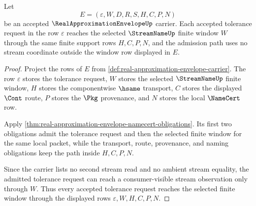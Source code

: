 \begin{theorem}
\label{thm:real-approximation-envelope-tolerance-window-admission}
Let
$$
E=(\varepsilon,W,D,R,S,H,C,P,N)
$$
be an accepted $\RealApproximationEnvelopeUp$ carrier. Each accepted tolerance request in the row $\varepsilon$ reaches the selected $\StreamNameUp$ finite window $W$ through the same finite support rows $H,C,P,N$, and the admission path uses no stream coordinate outside the window row displayed in $E$.
\end{theorem}
\begin{proof}
Project the rows of $E$ from \autoref{def:real-approximation-envelope-carrier}. The row $\varepsilon$ stores the tolerance request, $W$ stores the selected $\StreamNameUp$ finite window, $H$ stores the componentwise $\hsame$ transport, $C$ stores the displayed $\Cont$ route, $P$ stores the $\Pkg$ provenance, and $N$ stores the local $\NameCert$ row.

Apply \autoref{thm:real-approximation-envelope-namecert-obligations}. Its first two obligations admit the tolerance request and then the selected finite window for the same local packet, while the transport, route, provenance, and naming obligations keep the path inside $H,C,P,N$.

Since the carrier lists no second stream read and no ambient stream equality, the admitted tolerance request can reach a consumer-visible stream observation only through $W$. Thus every accepted tolerance request reaches the selected finite window through the displayed rows $\varepsilon,W,H,C,P,N$.
\end{proof}

